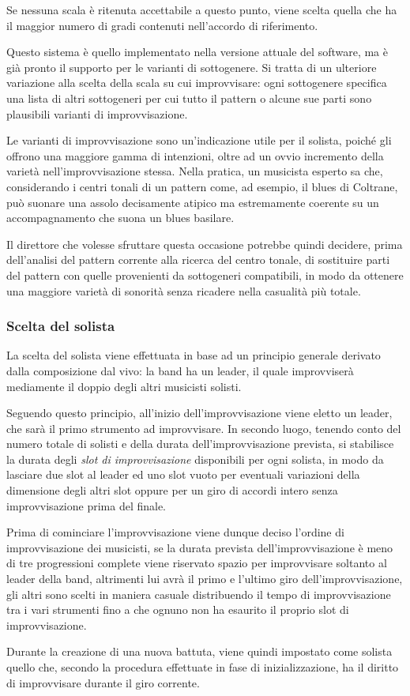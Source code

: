Se nessuna scala è ritenuta accettabile a questo punto, viene scelta quella che ha il maggior numero di gradi contenuti nell'accordo di riferimento.

Questo sistema è quello implementato nella versione attuale del software, ma è già pronto il supporto per le varianti di sottogenere. Si tratta di un ulteriore variazione alla scelta della scala su cui improvvisare: ogni sottogenere specifica una lista di altri sottogeneri per cui tutto il pattern o alcune sue parti sono plausibili varianti di improvvisazione.

Le varianti di improvvisazione sono un'indicazione utile per il solista, poiché gli offrono una maggiore gamma di intenzioni, oltre ad un ovvio incremento della varietà nell'improvvisazione stessa. Nella pratica, un musicista esperto sa che, considerando i centri tonali di un pattern come, ad esempio, il blues di Coltrane, può suonare una assolo decisamente atipico ma estremamente coerente su un accompagnamento che suona un blues basilare.

Il direttore che volesse sfruttare questa occasione potrebbe quindi decidere, prima dell'analisi del pattern corrente alla ricerca del centro tonale, di sostituire parti del pattern con quelle provenienti da sottogeneri compatibili, in modo da ottenere una maggiore varietà di sonorità senza ricadere nella casualità più totale.

\subsubsection{Scelta del solista}
La scelta del solista viene effettuata in base ad un principio generale derivato dalla composizione dal vivo\cite{soundpainting}: la band ha un leader, il quale improvviserà mediamente il doppio degli altri musicisti solisti.

Seguendo questo principio, all'inizio dell'improvvisazione viene eletto un leader, che sarà il primo strumento ad improvvisare. In secondo luogo, tenendo conto del numero totale di solisti e della durata dell'improvvisazione prevista, si stabilisce la durata degli \emph{slot di improvvisazione} disponibili per ogni solista, in modo da lasciare due slot al leader ed uno slot vuoto per eventuali variazioni della dimensione degli altri slot oppure per un giro di accordi intero senza improvvisazione prima del finale.

Prima di cominciare l'improvvisazione viene dunque deciso l'ordine di improvvisazione dei musicisti, se la durata prevista dell'improvvisazione è meno di tre progressioni complete viene riservato spazio per improvvisare soltanto al leader della band, altrimenti lui avrà il primo e l'ultimo giro dell'improvvisazione, gli altri sono scelti in maniera casuale distribuendo il tempo di improvvisazione tra i vari strumenti fino a che ognuno non ha esaurito il proprio slot di improvvisazione.

Durante la creazione di una nuova battuta, viene quindi impostato come solista quello che, secondo la procedura effettuate in fase di inizializzazione, ha il diritto di improvvisare durante il giro corrente.
